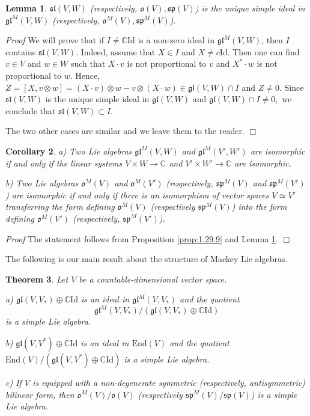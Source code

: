 \documentclass[10pt]{amsart}
\newcounter{theorem}
\newtheorem{theo}{Theorem}[section]
\newtheorem{lemma}[theo]{Lemma}
\newtheorem{corollary}[theo]{Corollary}
\renewenvironment{proof}{ \emph{Proof}}{$\Box$}
\newcommand {\CC} {\mathbb {C}}
\renewcommand{\sp}{\mathfrak{sp}}
\renewcommand{\sl}{\mathfrak{sl}}
\newcommand{\id}{\mathrm{Id}}
\newcommand{\oo}{\mathfrak{o}}
\newcommand{\gl}{\mathfrak{gl}}
\newcommand{\End}{\mathrm{End}}
\begin{document}
\begin{lemma}\label{lem_nz} $\sl(V,W)$ (respectively, $\oo(V), \sp(V)$) is the unique simple ideal in  $\gl^M(V,W)$ (respectively, $\oo^M(V), \sp^M(V)$). 
\end{lemma}

\begin{proof}
 We will prove that if $I\neq\CC\id$ is a non-zero ideal in $\gl^M(V,W)$, then $I$ contains  $\sl(V,W)$. Indeed, assume that $X\in I$ and $X\neq c\id$.
Then one can find $v\in V$ and $w\in W$ such that $X\cdot v$ is not proportional to $v$ and $X^*\cdot w$ is not proportional to $w$.
Hence, $Z=[X,v \otimes w]=(X\cdot v)\otimes w- v \otimes (X\cdot w)\in \gl(V,W) \cap I$ and $Z\neq 0$. Since $\sl(V,W)$ is the 
unique simple ideal in $\gl(V,W)$ and $\gl(V,W) \cap I\neq 0,$  we conclude that $\sl(V,W)\subset I$.

The two other cases are similar and we leave them to the reader.
\end{proof}

\begin{corollary}\label{corr:14_10}
a) Two Lie algebras $\gl^M(V,W)$ and $\gl^M(V',W')$ are isomorphic if and only if the linear systems $V\times W\rightarrow \CC$ and 
$V' \times W' \rightarrow \CC$ are isomorphic.

b) Two Lie algebras $\oo^M(V)$ and $\oo^M(V')$ (respectively, $\sp^M(V)$ and $\sp^M(V')$) are isomorphic if and only if there is an isomorphism of vector spaces $V\simeq V'$ transferring the form defining $\oo^M(V)$ (respectively $\sp^M(V)$) into the form defining $\oo^M(V')$ (respectively, $\sp^M(V')$).
\end{corollary}

\begin{proof}
 The statement follows from Proposition \ref{prop:1.29.9} and Lemma \ref{lem_nz}.
\end{proof}

\vspace{0.33cm}

The following is our main result about the structure of Mackey Lie algebras.

\begin{theo} \label{maintheo} Let $V$ be a countable-dimensional vector space. 

a) $\gl(V,V_*) \oplus \CC \id$ is an ideal in $\gl^M(V,V_*)$ and the 
quotient $$\gl^M(V,V_*)/\left(\gl(V,V_*)\oplus \CC \id\right)$$ 
is a simple Lie algebra.

b)  $\gl(V, V^*) \oplus \CC \id$ is an ideal in $\End(V)$ and the quotient
$\End(V)/\left(\gl(V, V^*) \oplus \CC \id\right)$ 
is a simple Lie algebra. 

c) If $V$ is equipped with a non-degenerate symmetric (respectively, antisymmetric) bilinear form, then $\oo^M(V)/\oo(V)$ (respectively $\sp^M(V)/\sp(V)$) 
is a simple Lie algebra.
\end{theo}
\end{document}
